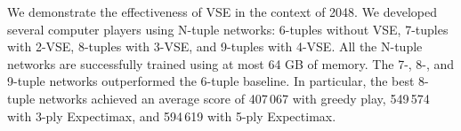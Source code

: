 We demonstrate the effectiveness of VSE in the context of 2048.
We developed several computer players using N-tuple networks: 6-tuples without VSE, 7-tuples with 2-VSE, 8-tuples with 3-VSE, and 9-tuples with 4-VSE.  All the N-tuple networks are successfully trained using at most 64 GB of memory.
The 7-, 8-, and 9-tuple networks outperformed the 6-tuple baseline.
In particular, the best 8-tuple networks achieved an average score of 407\,067 with greedy play, 549\,574 with 3-ply Expectimax, and 594\,619 with 5-ply Expectimax.

